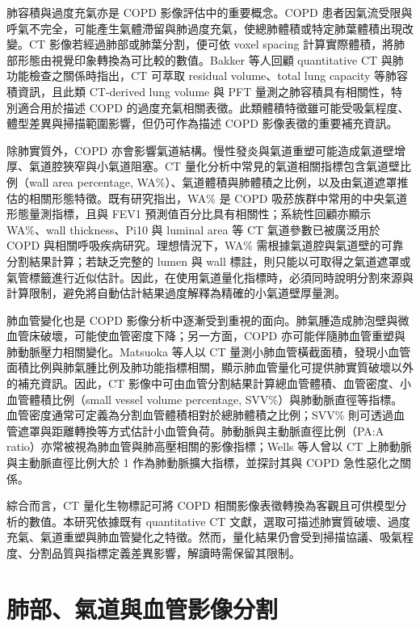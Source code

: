\begin{ZhChapter}
肺容積與過度充氣亦是 COPD 影像評估中的重要概念。COPD 患者因氣流受限與呼氣不完全，可能產生氣體滯留與肺過度充氣，使總肺體積或特定肺葉體積出現改變。CT 影像若經過肺部或肺葉分割，便可依 voxel spacing 計算實際體積，將肺部形態由視覺印象轉換為可比較的數值。Bakker 等人回顧 quantitative CT 與肺功能檢查之關係時指出，CT 可萃取 residual volume、total lung capacity 等肺容積資訊，且此類 CT-derived lung volume 與 PFT 量測之肺容積具有相關性，特別適合用於描述 COPD 的過度充氣相關表徵\cite{bakker2021qctpft}。此類體積特徵雖可能受吸氣程度、體型差異與掃描範圍影響，但仍可作為描述 COPD 影像表徵的重要補充資訊。

除肺實質外，COPD 亦會影響氣道結構。慢性發炎與氣道重塑可能造成氣道壁增厚、氣道腔狹窄與小氣道阻塞。CT 量化分析中常見的氣道相關指標包含氣道壁比例（wall area percentage, WA\%）、氣道體積與肺體積之比例，以及由氣道遮罩推估的相關形態特徵。既有研究指出，WA\% 是 COPD 吸菸族群中常用的中央氣道形態量測指標，且與 FEV1 預測值百分比具有相關性；系統性回顧亦顯示 WA\%、wall thickness、Pi10 與 luminal area 等 CT 氣道參數已被廣泛用於 COPD 與相關呼吸疾病研究\cite{washko2014airway,dudurych2022bronchial}。理想情況下，WA\% 需根據氣道腔與氣道壁的可靠分割結果計算；若缺乏完整的 lumen 與 wall 標註，則只能以可取得之氣道遮罩或氣管標籤進行近似估計。因此，在使用氣道量化指標時，必須同時說明分割來源與計算限制，避免將自動估計結果過度解釋為精確的小氣道壁厚量測。

肺血管變化也是 COPD 影像分析中逐漸受到重視的面向。肺氣腫造成肺泡壁與微血管床破壞，可能使血管密度下降；另一方面，COPD 亦可能伴隨肺血管重塑與肺動脈壓力相關變化。Matsuoka 等人以 CT 量測小肺血管橫截面積，發現小血管面積比例與肺氣腫比例及肺功能指標相關，顯示肺血管量化可提供肺實質破壞以外的補充資訊\cite{matsuoka2010smallvessel}。因此，CT 影像中可由血管分割結果計算總血管體積、血管密度、小血管體積比例（small vessel volume percentage, SVV\%）與肺動脈直徑等指標。血管密度通常可定義為分割血管體積相對於總肺體積之比例；SVV\% 則可透過血管遮罩與距離轉換等方式估計小血管負荷。肺動脈與主動脈直徑比例（PA:A ratio）亦常被視為肺血管與肺高壓相關的影像指標；Wells 等人曾以 CT 上肺動脈與主動脈直徑比例大於 1 作為肺動脈擴大指標，並探討其與 COPD 急性惡化之關係\cite{wells2012paenlargement}。

綜合而言，CT 量化生物標記可將 COPD 相關影像表徵轉換為客觀且可供模型分析的數值。本研究依據既有 quantitative CT 文獻，選取可描述肺實質破壞、過度充氣、氣道重塑與肺血管變化之特徵。然而，量化結果仍會受到掃描協議、吸氣程度、分割品質與指標定義差異影響，解讀時需保留其限制。

\section{肺部、氣道與血管影像分割}


\end{ZhChapter}
